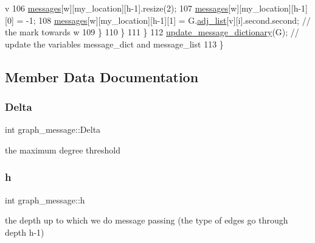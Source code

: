 \begin{DoxyCode}
{       v}
106         \hyperlink{classgraph__message_a06a1d1ab91b4891c65ea80205566f800}{messages}[w][my\_location][h-1].resize(2);
107         \hyperlink{classgraph__message_a06a1d1ab91b4891c65ea80205566f800}{messages}[w][my\_location][h-1][0] = -1;
108         \hyperlink{classgraph__message_a06a1d1ab91b4891c65ea80205566f800}{messages}[w][my\_location][h-1][1] = G.\hyperlink{classmarked__graph_a1a0bf7ca413a278763f7c878b3b6fd6f}{adj\_list}[v][i].second.second; \textcolor{comment}{// the mark
       towards w}
109       \}
110     \}
111   \}
112   \hyperlink{classgraph__message_a77d137b371134e292283fdd78634f4d4}{update\_message\_dictionary}(G); \textcolor{comment}{// update the variables message\_dict and
       message\_list}
113 \}
\end{DoxyCode}


\subsection{Member Data Documentation}
\mbox{\label{classgraph__message_a45dfd061b7bc73572e5132fbf66efd55}} 
\subsubsection{\texorpdfstring{Delta}{Delta}}
{\footnotesize\ttfamily int graph\+\_\+message\+::\+Delta\hspace{0.3cm}{\ttfamily [private]}}



the maximum degree threshold 

\mbox{\label{classgraph__message_a934d63ed7275c211e13c6fb68824ed46}} 
\subsubsection{\texorpdfstring{h}{h}}
{\footnotesize\ttfamily int graph\+\_\+message\+::h\hspace{0.3cm}{\ttfamily [private]}}



the depth up to which we do message passing (the type of edges go through depth h-\/1) 

\mbox{\label{classgraph__message_a7890d2dff06b9de6f98734c69d8fbcfd}} 
